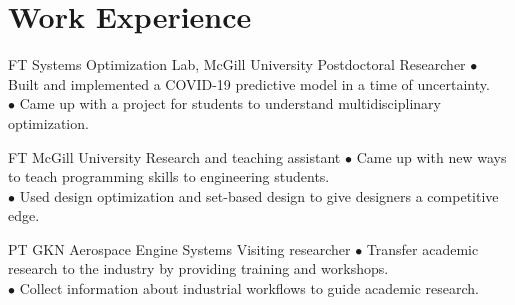 \documentclass[10pt]{article} %
\begin{document}

\section{Work Experience}





{FT} %
{Systems Optimization Lab, McGill University} %
{Postdoctoral Researcher} %
{
	$\bullet$ Built and implemented a COVID-19 predictive model in a time of uncertainty.\\
	$\bullet$ Came up with a project for students to understand multidisciplinary optimization.
} %


{FT} %
{McGill University} %
{Research and teaching assistant} %
{
	$\bullet$ Came up with new ways to teach programming skills to engineering students.\\
	$\bullet$ Used design optimization and set-based design to give designers a competitive edge.
}  %


{PT} %
{GKN Aerospace Engine Systems} %
{Visiting researcher} %
{
	$\bullet$ Transfer academic research to the industry by providing training and workshops.\\
	$\bullet$ Collect information about industrial workflows to guide academic research.
}  %


\vspace{-\baselineskip} %
\end{document}
